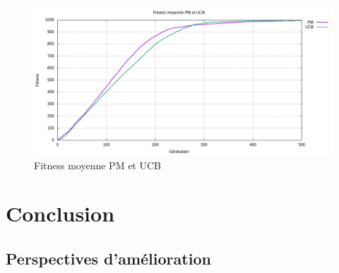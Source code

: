 \documentclass[12pt]{article}
\begin{document}
\begin{figure}[H]
	\begin{center}
		\includegraphics[scale=0.5]{img/curve_fitness_ucb_pm.png}
		\caption{Fitness moyenne PM et UCB}
		\label{curve_fitness_ucb_pm}
	\end{center}
\end{figure}

\section{Conclusion}
\subsection{Perspectives d'amélioration}
\end{document}
